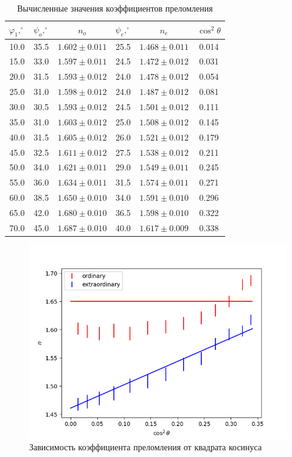 \documentclass[a4paper,12pt]{article}
\begin{document}
\begin{table}[H]
    \centering
    \caption{Вычисленные значения коэффициентов преломления}
    \begin{tabular}{|c|c|c|c|c|c|} \hline
    $\varphi_1, ^\circ$ & $\psi_o, ^\circ$ & $n_o$ & $\psi_e, ^\circ$ & $n_e$ & $\cos^2\theta$ \\ \hline
10.0 & 35.5 & $1.602 \pm 0.011$ & 25.5 & $1.468 \pm 0.011$ & 0.014 \\ \hline
15.0 & 33.0 & $1.597 \pm 0.011$ & 24.5 & $1.472 \pm 0.012$ & 0.031 \\ \hline
20.0 & 31.5 & $1.593 \pm 0.012$ & 24.0 & $1.478 \pm 0.012$ & 0.054 \\ \hline
25.0 & 31.0 & $1.598 \pm 0.012$ & 24.0 & $1.487 \pm 0.012$ & 0.081 \\ \hline
30.0 & 30.5 & $1.593 \pm 0.012$ & 24.5 & $1.501 \pm 0.012$ & 0.111 \\ \hline
35.0 & 31.0 & $1.603 \pm 0.012$ & 25.0 & $1.508 \pm 0.012$ & 0.145 \\ \hline
40.0 & 31.5 & $1.605 \pm 0.012$ & 26.0 & $1.521 \pm 0.012$ & 0.179 \\ \hline
45.0 & 32.5 & $1.611 \pm 0.012$ & 27.5 & $1.538 \pm 0.012$ & 0.211 \\ \hline
50.0 & 34.0 & $1.621 \pm 0.011$ & 29.0 & $1.549 \pm 0.011$ & 0.245 \\ \hline
55.0 & 36.0 & $1.634 \pm 0.011$ & 31.5 & $1.574 \pm 0.011$ & 0.271 \\ \hline
60.0 & 38.5 & $1.650 \pm 0.010$ & 34.0 & $1.591 \pm 0.010$ & 0.296 \\ \hline
65.0 & 42.0 & $1.680 \pm 0.010$ & 36.5 & $1.598 \pm 0.010$ & 0.322 \\ \hline
70.0 & 45.0 & $1.687 \pm 0.010$ & 40.0 & $1.617 \pm 0.009$ & 0.338 \\ \hline
    \end{tabular}
\end{table}

\begin{figure}[H]
    \centering
    \includegraphics[scale=0.7]{plot.png}
    \caption{Зависимость коэффициента преломления от квадрата косинуса}
\end{figure}
\end{document}
